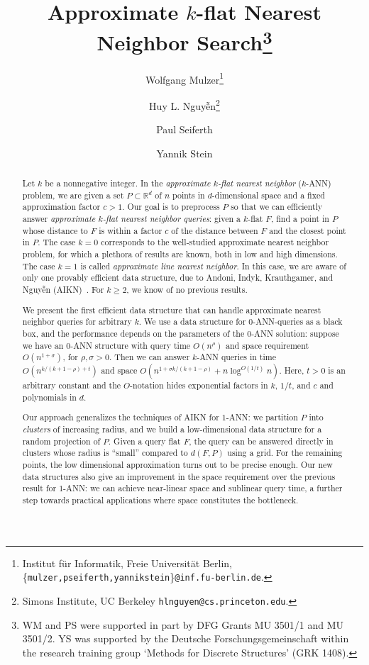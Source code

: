 \documentclass[a4paper,11pt]{paper}
\title{Approximate $k$-flat Nearest Neighbor
  Search\thanks{WM and PS
were supported in part by DFG Grants MU 3501/1 and MU 3501/2.
YS was supported by the Deutsche Forschungsgemeinschaft within
the research training group `Methods for Discrete Structures'
(GRK 1408).}}
\author
{
Wolfgang Mulzer\thanks{Institut f\"ur Informatik,
Freie Universit\"at Berlin,
\{\texttt{mulzer,pseiferth,yannikstein}\}\texttt{@inf.fu-berlin.de}.}
\and
Huy L. Nguy\~{\^{e}}n\thanks{Simons Institute, UC Berkeley
\texttt{hlnguyen@cs.princeton.edu}.}
\and
Paul Seiferth\footnotemark[2]
\and
Yannik Stein\footnotemark[2]
}
\newcommand{\mathset}[1]{\ensuremath {\mathbb {#1}}}
\newcommand{\R}{\mathset{R}}
\begin{document}
\maketitle

\begin{abstract}
Let $k$ be a nonnegative integer.
In the \emph{approximate $k$-flat nearest neighbor}
($k$-ANN) problem, we are given a set
$P \subset \R^d$ of $n$ points in
$d$-dimensional space and a fixed approximation
factor $c > 1$. Our goal is to
preprocess $P$ so that we can efficiently
answer \emph{approximate $k$-flat nearest
neighbor queries}: given a $k$-flat $F$,
find a point in $P$ whose distance to
$F$ is within a factor  $c$ of the
distance between $F$ and the closest
point in $P$. The case $k = 0$ corresponds to
the well-studied approximate nearest neighbor
problem, for which a plethora of results are known,
both in low and high dimensions.
The case $k = 1$ is called \emph{approximate line
nearest neighbor}. In this case, we are aware of only
one provably efficient data structure, due to
Andoni, Indyk, Krauthgamer,
and Nguy\~{\^{e}}n (AIKN)~\cite{AndoniInKrNg09}.
For $k \geq 2$, we know of no previous results.

We present the first efficient data structure that
can handle approximate nearest neighbor queries for
arbitrary $k$. We use a data structure
for $0$-ANN-queries as a black box, and the performance
depends on the parameters of the $0$-ANN
solution: suppose we have an $0$-ANN structure
with query time $O(n^{\rho})$ and space requirement
$O(n^{1+\sigma})$, for $\rho, \sigma > 0$.
Then we can answer $k$-ANN queries in time
$O(n^{k/(k + 1 - \rho) + t})$ and space
$O(n^{1+\sigma k/(k + 1 - \rho)} + n\log^{O(1/t)} n)$.
Here, $t > 0$ is an arbitrary constant and the $O$-notation
hides exponential factors in $k$, $1/t$, and $c$ and
polynomials in $d$.

Our approach generalizes the techniques of AIKN for
$1$-ANN: we partition $P$ into \emph{clusters} of increasing
radius, and we build a low-dimensional data structure for
a random projection of $P$. Given a query flat $F$, the
query can be answered directly in clusters whose radius is
``small'' compared to $d(F, P)$ using a grid. For the
remaining points, the low dimensional approximation turns out to
be precise enough.
Our new data structures also give an improvement in the space
requirement over the previous result for $1$-ANN: we can achieve
near-linear space and sublinear query time, a further step
towards practical applications where space  constitutes
the bottleneck.
\end{abstract}
\newpage
\setcounter{page}{1}
\end{document}
